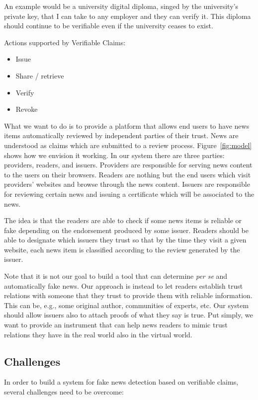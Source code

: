 \documentclass[letterpaper,twocolumn,10pt]{article}
\begin{document}
An example would be a university digital diploma, singed by the university’s private key, that I can take to any employer and they can verify it. This diploma should continue to be verifiable even if the university ceases to exist.

Actions supported by Verifiable Claims:
\begin{itemize}
    \item Issue
    \item Share / retrieve
    \item Verify
    \item Revoke
\end{itemize}


What we want to do is to provide a platform that allows end users to have news items automatically reviewed by independent parties of their trust. News are understood as claims which are submitted to a review process. Figure~\ref{fig:model} shows how we envision it working. In our system there are three parties: providers, readers, and issuers. Providers are responsible for serving news content to the users on their browsers. Readers are nothing but the end users which visit providers' websites and browse through the news content. Issuers are responsible for reviewing certain news and issuing a certificate which will be associated to the news.

The idea is that the readers are able to check if some news items is reliable or fake depending on the endorsement produced by some issuer. Readers should be able to designate which issuers they trust so that by the time they visit a given website, each news item is classified according to the review generated by the issuer.

Note that it is not our goal to build a tool that can determine {\em per se} and automatically fake news. Our approach is instead to let readers establish trust relations with someone that they trust to provide them with reliable information. This can be, e.g., some original author, communities of experts, etc. Our system should allow issuers also to attach proofs of what they say is true. Put simply, we want to provide an instrument that can help news readers to mimic trust relations they have in the real world also in the virtual world.


\subsection{Challenges}

In order to build a system for fake news detection based on verifiable claims, several challenges need to be overcome:
\end{document}
